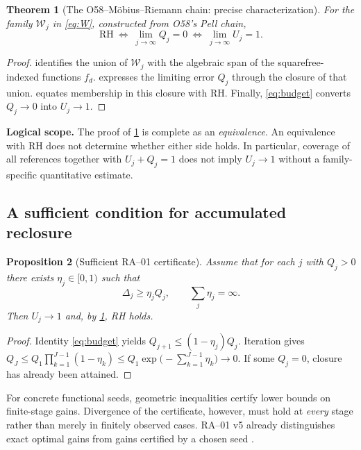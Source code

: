\documentclass[11pt,a4paper]{article}
\theoremstyle{mine}
\newtheorem{theorem}{Theorem}[section]
\newtheorem{proposition}[theorem]{Proposition}
\theoremstyle{definition}
\newcommand{\WW}{\mathcal W}
\newcommand{\RH}{\mathrm{RH}}
\begin{document}
\begin{theorem}[The O58--M\"obius--Riemann chain: precise characterization]\label{th:main}
For the family $\WW_j$ in \eqref{eq:W}, constructed from O58's Pell chain,
\begin{equation}\label{eq:main}
\boxed{\qquad \RH\ \Longleftrightarrow\ \lim_{j\to\infty}Q_j=0
\ \Longleftrightarrow\ \lim_{j\to\infty}U_j=1.\qquad}
\end{equation}
\end{theorem}
\begin{proof}
 identifies the union of $\WW_j$ with the algebraic span of the squarefree-indexed functions $f_d$.  expresses the limiting error $Q_j$ through the closure of that union.  equates membership in this closure with RH. Finally, \eqref{eq:budget} converts $Q_j\to0$ into $U_j\to1$.
\end{proof}

\textbf{Logical scope.} The proof of \cref{th:main} is complete as an \emph{equivalence}. An equivalence with RH does not determine whether either side holds. In particular, coverage of all references together with $U_j+Q_j=1$ does not imply $U_j\to1$ without a family-specific quantitative estimate.

\subsection{A sufficient condition for accumulated reclosure}

\begin{proposition}[Sufficient RA--01 certificate]\label{pr:RA}
Assume that for each $j$ with $Q_j>0$ there exists $\eta_j\in[0,1)$ such that
\begin{equation}\label{eq:contract}
\Delta_j\ge\eta_j Q_j,\qquad\sum_j\eta_j=\infty.
\end{equation}
Then $U_j\to1$ and, by \cref{th:main}, RH holds.
\end{proposition}
\begin{proof}
Identity \eqref{eq:budget} yields $Q_{j+1}\le (1-\eta_j)Q_j$. Iteration gives
$Q_J\le Q_1\prod_{k=1}^{J-1}(1-\eta_k)\le Q_1\exp\bigl(-\sum_{k=1}^{J-1}\eta_k\bigr)\to0$. If some $Q_j=0$, closure has already been attained.
\end{proof}

For concrete functional seeds, geometric inequalities certify lower bounds on finite-stage gains. Divergence of the certificate, however, must hold at \emph{every} stage rather than merely in finitely observed cases. RA--01 v5 already distinguishes exact optimal gains from gains certified by a chosen seed \cite{RA01Audit}.
\end{document}
